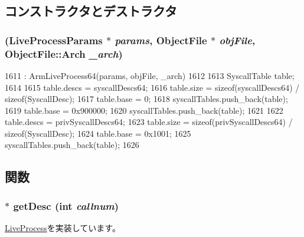 \subsection{コンストラクタとデストラクタ}
\hypertarget{classArmLinuxProcess64_ad3971523367f3ae2de449cbf4d43521e}{
\subsubsection[{ArmLinuxProcess64}]{ (LiveProcessParams $\ast$ {\em params}, \/  {\bf ObjectFile} $\ast$ {\em objFile}, \/  {\bf ObjectFile::Arch} {\em \_\-arch})}}
\label{classArmLinuxProcess64_ad3971523367f3ae2de449cbf4d43521e}



\begin{DoxyCode}
1611     : ArmLiveProcess64(params, objFile, _arch)
1612 {
1613     SyscallTable table;
1614 
1615     table.descs = syscallDescs64;
1616     table.size = sizeof(syscallDescs64) / sizeof(SyscallDesc);
1617     table.base = 0;
1618     syscallTables.push_back(table);
1619     table.base = 0x900000;
1620     syscallTables.push_back(table);
1621 
1622     table.descs = privSyscallDescs64;
1623     table.size = sizeof(privSyscallDescs64) / sizeof(SyscallDesc);
1624     table.base = 0x1001;
1625     syscallTables.push_back(table);
1626 }
\end{DoxyCode}


\subsection{関数}
\hypertarget{classArmLinuxProcess64_aebbff609a7235342925445690acf5ee8}{
\subsubsection[{getDesc}]{ $\ast$ getDesc (int {\em callnum})}}
\label{classArmLinuxProcess64_aebbff609a7235342925445690acf5ee8}


\hyperlink{classLiveProcess_a478f396f8895ef7728d26866a00121d7}{LiveProcess}を実装しています。


